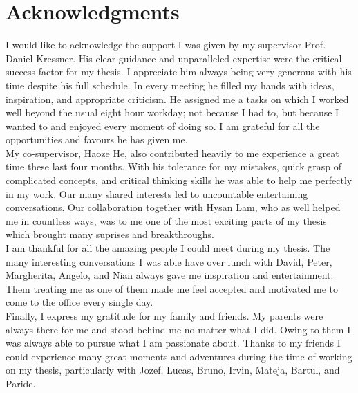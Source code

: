 \chapter*{Acknowledgments}
\label{chp:0-acknowledgments}

I would like to acknowledge the support I was given by my supervisor
Prof. Daniel Kressner. His clear guidance and unparalleled expertise were the
critical success factor for my thesis. I appreciate him always being very generous
with his time despite his full schedule. In every meeting he filled my hands with
ideas, inspiration, and appropriate criticism. He assigned me a tasks on which
I worked well beyond the usual eight hour workday; not because I had to, but because
I wanted to and enjoyed every moment of doing so. I am grateful for all the
opportunities and favours he has given me.\\ %

My co-supervisor, Haoze He, also contributed heavily to me experience a great time
these last four months. With his tolerance for my mistakes, quick grasp of
complicated concepts, and critical thinking skills he was able to help me
perfectly in my work. Our many shared interests led to uncountable
entertaining conversations. Our collaboration together with Hysan Lam, who
as well helped me in countless ways, was to me one of the most exciting parts of
my thesis which brought many suprises and breakthroughs.\\

I am thankful for all the amazing people I could meet during my thesis.
The many interesting conversations I was able have over lunch with David, Peter,
Margherita, Angelo, and Nian always gave me inspiration and entertainment.
Them treating me as one of them made me feel accepted and motivated me to come
to the office every single day.\\

Finally, I express my gratitude for my family and friends.
My parents were always there for me and stood behind me no matter what I did.
Owing to them I was always able to pursue what I am passionate about.
Thanks to my friends I could experience many great moments and adventures
during the time of working on my thesis, particularly with Jozef, Lucas, Bruno,
Irvin, Mateja, Bartul, and Paride.
